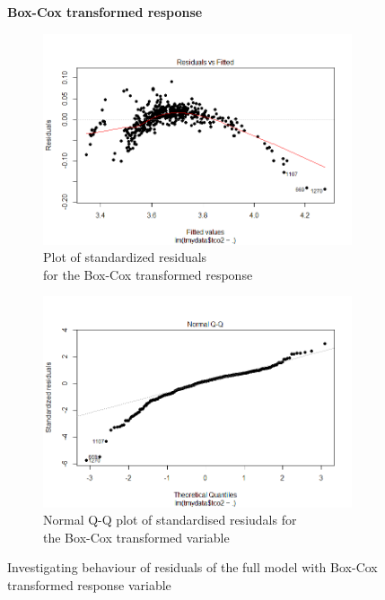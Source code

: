 \documentclass[12pt]{article}
\begin{document}
\begin{figure}[h]
  \centering
  \textbf{Box-Cox transformed response}
  \begin{subfigure}[b]{0.5\linewidth}
      \centering
      \includegraphics[width=\textwidth]{project3/resVsFit_BoxCox.png}
      \caption{Plot of standardized residuals \\ for the Box-Cox transformed response}
      \label{fig:resVsFit_BoxCox}
  \end{subfigure}%
  \begin{subfigure}[b]{0.5\linewidth}
      \centering
   \includegraphics[width=\textwidth]{project3/QQ_BoxCox.png}
   \caption{Normal Q-Q plot of standardised resiudals for \\the Box-Cox transformed variable}\label{fig:QQ_BoxCox}
  \end{subfigure}%
 \caption{Investigating behaviour of residuals of the full model with Box-Cox transformed response variable}
 \label{fig:BoxCox}
\end{figure}
\end{document}
